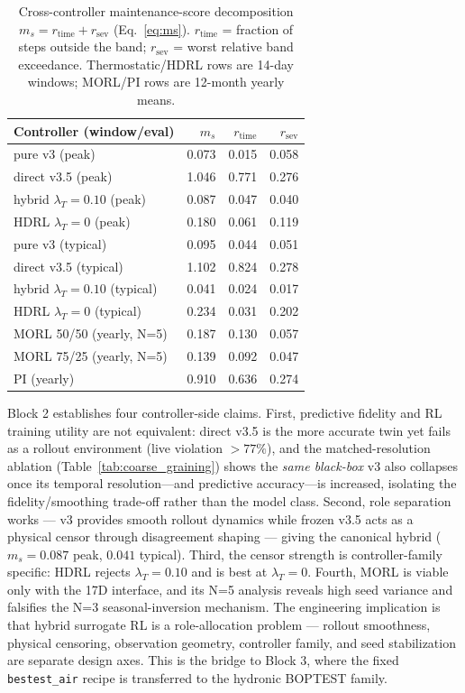 \documentclass[11pt,a4paper]{article}
\begin{document}
\begin{table}[H]
\centering
\caption{Cross-controller maintenance-score decomposition $m_s = r_{\mathrm{time}} + r_{\mathrm{sev}}$ (Eq.~\ref{eq:ms}). $r_{\mathrm{time}}$ = fraction of steps outside the band; $r_{\mathrm{sev}}$ = worst relative band exceedance. Thermostatic/HDRL rows are 14-day windows; MORL/PI rows are 12-month yearly means.}
\label{tab:ms_decomp}
\small
\begin{tabular}{lrrr}
\toprule
Controller (window/eval) & $m_s$ & $r_{\mathrm{time}}$ & $r_{\mathrm{sev}}$ \\
\midrule
pure v3 (peak) & 0.073 & 0.015 & 0.058 \\
direct v3.5 (peak) & 1.046 & 0.771 & 0.276 \\
hybrid $\lambda_T{=}0.10$ (peak) & 0.087 & 0.047 & 0.040 \\
HDRL $\lambda_T{=}0$ (peak) & 0.180 & 0.061 & 0.119 \\
pure v3 (typical) & 0.095 & 0.044 & 0.051 \\
direct v3.5 (typical) & 1.102 & 0.824 & 0.278 \\
hybrid $\lambda_T{=}0.10$ (typical) & 0.041 & 0.024 & 0.017 \\
HDRL $\lambda_T{=}0$ (typical) & 0.234 & 0.031 & 0.202 \\
MORL 50/50 (yearly, N=5) & 0.187 & 0.130 & 0.057 \\
MORL 75/25 (yearly, N=5) & 0.139 & 0.092 & 0.047 \\
PI (yearly) & 0.910 & 0.636 & 0.274 \\
\bottomrule
\end{tabular}
\end{table}

Block 2 establishes four controller-side claims. First, predictive fidelity and RL training utility are not equivalent: direct v3.5 is the more accurate twin yet fails as a rollout environment (live violation $>77\%$), and the matched-resolution ablation (Table~\ref{tab:coarse_graining}) shows the \emph{same black-box} v3 also collapses once its temporal resolution---and predictive accuracy---is increased, isolating the fidelity/smoothing trade-off rather than the model class. Second, role separation works --- v3 provides smooth rollout dynamics while frozen v3.5 acts as a physical censor through disagreement shaping --- giving the canonical hybrid ($m_s=0.087$ peak, $0.041$ typical). Third, the censor strength is controller-family specific: HDRL rejects $\lambda_T=0.10$ and is best at $\lambda_T=0$. Fourth, MORL is viable only with the 17D interface, and its N=5 analysis reveals high seed variance and falsifies the N=3 seasonal-inversion mechanism. The engineering implication is that hybrid surrogate RL is a role-allocation problem --- rollout smoothness, physical censoring, observation geometry, controller family, and seed stabilization are separate design axes. This is the bridge to Block 3, where the fixed \texttt{bestest\_air} recipe is transferred to the hydronic BOPTEST family.
\end{document}
